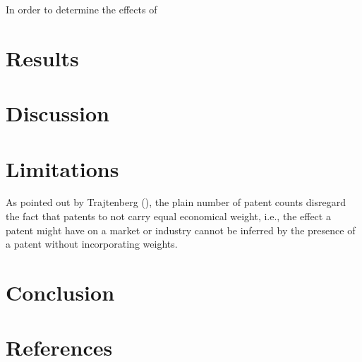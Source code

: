 \documentclass[
  11,
  a4paperpaper,
]{article}
\begin{document}
In order to determine the effects of

\section{Results}\label{results}

\section{Discussion}\label{discussion}

\section{Limitations}\label{limitations}

As pointed out by Trajtenberg
(), the plain number of
patent counts disregard the fact that patents to not carry equal
economical weight, i.e., the effect a patent might have on a market or
industry cannot be inferred by the presence of a patent without
incorporating weights.

\section{Conclusion}\label{conclusion}

\newpage{}

\section*{References}\label{sec-references}
\end{document}

